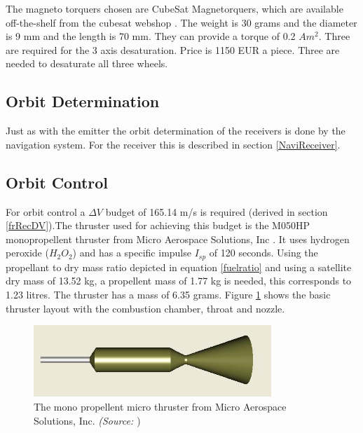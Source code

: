 The magneto torquers chosen are CubeSat Magnetorquers, which are available off-the-shelf from the cubesat webshop \cite{cubesatshop}. The weight is 30 grams and the diameter is 9 mm and the length is 70 mm. They can provide a torque of 0.2 $Am^2$. Three are required for the 3 axis desaturation. Price is 1150 EUR a piece. Three are needed to desaturate all three wheels.

\subsection{Orbit Determination}
\label{ss:recDDods}
Just as with the emitter the orbit determination of the receivers is done by the navigation system. For the receiver this is described in section \ref{NaviReceiver}.

\subsection{Orbit Control}
\label{ss:recDDocs}
For orbit control a $\Delta V$ budget of 165.14 m/s is required (derived in section \ref{frRecDV}).The thruster used for achieving this budget is the M050HP monopropellent thruster from Micro Aerospace Solutions, Inc \cite{h2o2thruster}. It uses hydrogen peroxide ($H_2O_2$) and has a specific impulse $I_{sp}$ of 120 seconds. Using the propellant to dry mass ratio depicted in equation \ref{fuelratio} and using a satellite dry mass of  13.52 kg, a propellent mass of  1.77 kg is needed, this corresponds to 1.23 litres. The thruster has a mass of 6.35 grams. Figure \ref{fig:microthrust} shows the basic thruster layout with the combustion chamber, throat and nozzle.

\begin{figure} [h]
\centering
\includegraphics[width=0.8\textwidth]{chapters/img/MAS_acsThruster.jpg}
\caption[Micro thruster]{The mono propellent micro thruster from Micro Aerospace Solutions, Inc. \emph{(Source: \cite{h2o2thruster}})}
\label{fig:microthrust}
\end{figure}

